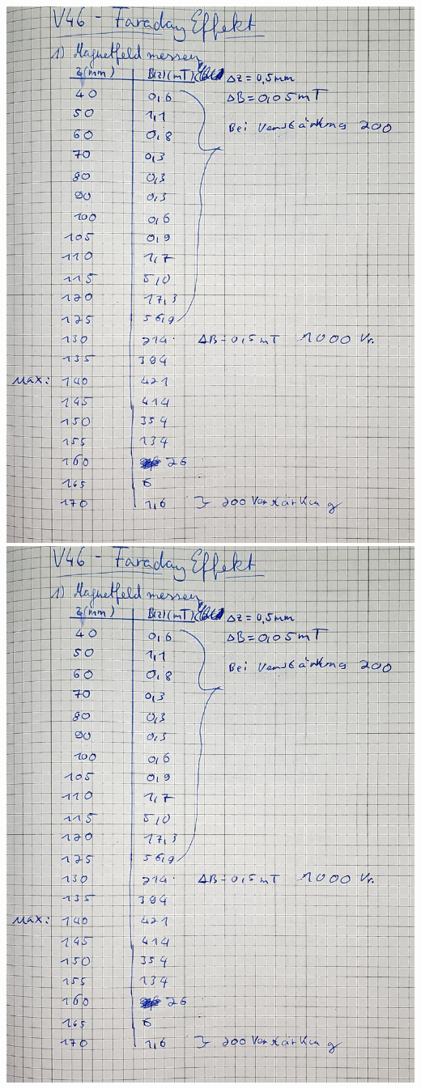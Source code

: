 \includegraphics[width=\textwidth,page=2]{Bilder/v46originaldaten.pdf}
\includegraphics[width=\textwidth,page=3]{Bilder/v46originaldaten.pdf}